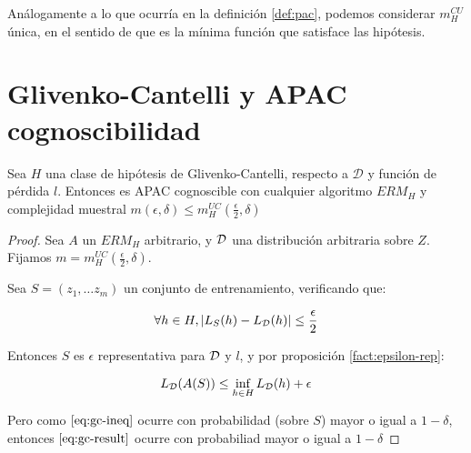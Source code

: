 Análogamente a lo que ocurría en la definición \ref{def:pac}, podemos considerar $m_H^{CU}$ única, en el sentido de
que es la mínima función que satisface las hipótesis.

\section{Glivenko-Cantelli y APAC cognoscibilidad}

\begin{theorem*}
Sea $H$ una clase de hipótesis de Glivenko-Cantelli, respecto a $\mathcal{D}$ y función de pérdida $l$. 
Entonces es APAC cognoscible con cualquier algoritmo $ERM_H$ y complejidad muestral
$m(\epsilon, \delta) \le m_{H}^{UC} \left(\frac{\epsilon}{2}, \delta \right)$ 
\end{theorem*}

  \begin{proof}
  Sea $A$ un $ERM_H$ arbitrario, y $\mathcal{D}$ una distribución arbitraria sobre $Z$.
  Fijamos $m = m_{H}^{UC} \left(\frac{\epsilon}{2}, \delta \right)$.

  Sea $S = (z_1, \ldots z_m)$ un conjunto de entrenamiento, verificando que: 

  \begin{equation}
    \forall h\in H, |L_{S}(h)-L_{\mathcal{D}}(h)| \le \frac{\epsilon}{2}
    \label{eq:gc-ineq}
  \end{equation}

  Entonces $S$ es $\epsilon$ representativa para $\mathcal{D}$ y $l$, y por proposición \ref{fact:epsilon-rep}:

  \begin{equation}
   L_{\mathcal{D}}(A(S)) \le \inf_{h\in H} L_{\mathcal{D}}(h) + \epsilon
   \label{eq:gc-result}
  \end{equation}

  Pero como $\eqref{eq:gc-ineq}$ ocurre con probabilidad (sobre $S$) mayor o igual a $1-\delta$, entonces $\eqref{eq:gc-result}$
  ocurre con probabiliad mayor o igual a $1-\delta$
  
  \end{proof}
  
